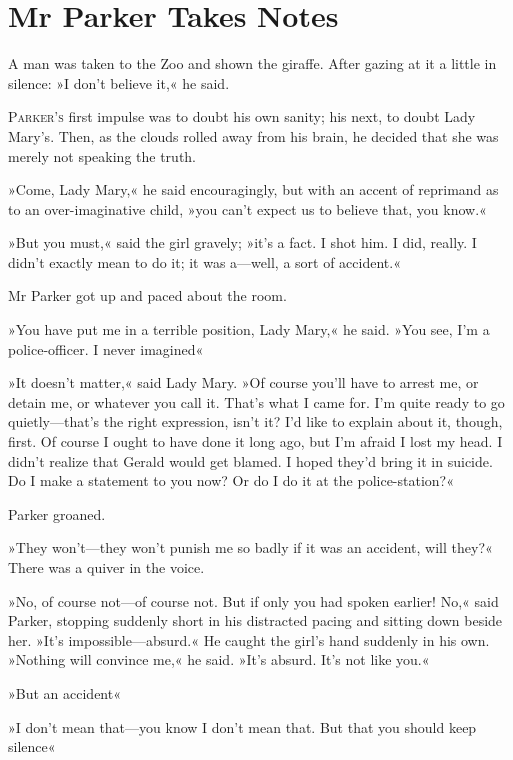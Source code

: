 

\chapter{Mr Parker Takes Notes}

\epigraph{A man was taken to the Zoo and shown the giraffe.  After gazing at it a little in silence: »I don't believe it,« he said.}{}


\lettrine[lines=4]{P}{arker's} first impulse was to doubt his own sanity; his next, to doubt Lady Mary's. Then, as the clouds rolled away from his brain, he decided that she was merely not speaking the truth.

\zz
»Come, Lady Mary,« he said encouragingly, but with an accent of reprimand as to an over-imaginative child, »you can't expect us to believe that, you know.«

»But you must,« said the girl gravely; »it's a fact. I shot him. I did, really. I didn't exactly mean to do it; it was a—well, a sort of accident.«

Mr Parker got up and paced about the room.

»You have put me in a terrible position, Lady Mary,« he said. »You see, I'm a police-officer. I never imagined\longdash«

»It doesn't matter,« said Lady Mary. »Of course you'll have to arrest me, or detain me, or whatever you call it. That's what I came for. I'm quite ready to go quietly—that's the right expression, isn't it? I'd like to explain about it, though, first. Of course I ought to have done it long ago, but I'm afraid I lost my head. I didn't realize that Gerald would get blamed. I hoped they'd bring it in suicide. Do I make a statement to you now? Or do I do it at the police-station?«

Parker groaned.

»They won't—they won't punish me so badly if it was an accident, will they?« There was a quiver in the voice.

»No, of course not—of course not. But if only you had spoken earlier!  No,« said Parker, stopping suddenly short in his distracted pacing and sitting down beside her. »It's impossible—absurd.« He caught the girl's hand suddenly in his own. »Nothing will convince me,« he said.  »It's absurd. It's not like you.«

»But an accident\longdash«

»I don't mean that—you know I don't mean that. But that you should keep silence\longdash«

